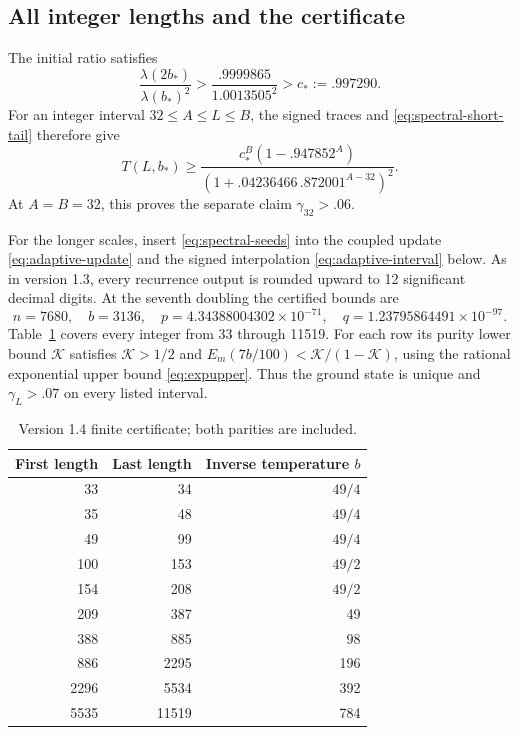 \documentclass[11pt,a4paper]{article}
\newcommand{\gap}{\gamma}
\begin{document}
\subsection{All integer lengths and the certificate}
The initial ratio satisfies
\[
 \frac{\lambda(2b_*)}{\lambda(b_*)^2}
 >\frac{.9999865}{1.0013505^2}>c_*:=.997290.
\]
For an integer interval $32\le A\le L\le B$, the signed traces and
\eqref{eq:spectral-short-tail} therefore give
\begin{equation}\label{eq:spectral-short}
 T(L,b_*)\ge
 \frac{c_*^B(1-.947852^A)}
 {(1+.04236466\,.872001^{A-32})^2}.
\end{equation}
At $A=B=32$, this proves the separate claim $\gap_{32}>.06$.

For the longer scales, insert \eqref{eq:spectral-seeds} into the
coupled update \eqref{eq:adaptive-update} and the signed interpolation
\eqref{eq:adaptive-interval} below. As in version 1.3, every recurrence
output is rounded upward to 12 significant decimal digits. At the
seventh doubling the certified bounds are
\[
 n=7680,\quad b=3136,\quad
 p=4.34388004302\times10^{-71},\quad
 q=1.23795864491\times10^{-97}.
\]
Table~\ref{tab:spectral} covers every integer from 33 through 11519.
For each row its purity lower bound $\mathcal K$ satisfies
$\mathcal K>1/2$ and
$E_m(7b/100)<\mathcal K/(1-\mathcal K)$, using the rational exponential
upper bound \eqref{eq:expupper}. Thus the ground state is unique and
$\gap_L>.07$ on every listed interval.

\begin{table}[ht]
\centering
\caption{Version 1.4 finite certificate; both parities are included.}
\label{tab:spectral}
\begin{tabular}{rrr}
\toprule
First length & Last length & Inverse temperature $b$\\
\midrule
33 & 34 & $49/4$\\
35 & 48 & $49/4$\\
49 & 99 & $49/4$\\
100 & 153 & $49/2$\\
154 & 208 & $49/2$\\
209 & 387 & 49\\
388 & 885 & 98\\
886 & 2295 & 196\\
2296 & 5534 & 392\\
5535 & 11519 & 784\\
\bottomrule
\end{tabular}
\end{table}
\end{document}

